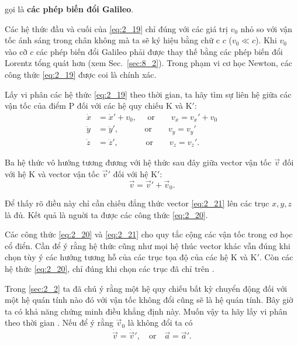 \noindent
gọi là \textbf{các phép biến đổi Galileo}.

Các hệ thức đầu và cuối của \eqref{eq:2_19} chỉ đúng với các giá trị $v_0$ nhỏ so với vận tốc ánh sáng trong chân không mà ta sẽ ký hiệu bằng chữ c $c$ ($v_0\ll c$). Khi $v_0$ vào cỡ $c$ các phép biến đổi Galileo phải được thay thế bằng các phép biến đổi Lorentz tổng quát hơn (xem Sec.~\ref{sec:8_2}). Trong phạm vi cơ học Newton, các công thức \eqref{eq:2_19} được coi là chính xác.

Lấy vi phân các hệ thức \eqref{eq:2_19} theo thời gian, ta hãy tìm sự liên hệ giữa các vận tốc của điểm P đối với các hệ quy chiếu K và K$'$:
\begin{align}
\dot{x} &= \dot{x}'+v_0, \quad\,\,\text{or}\quad\quad v_x=v_x'+v_0\nonumber\\
\dot{y} &= \dot{y}', \quad\quad\,\,\,\,\,\,\,\text{or}\quad\quad v_y=v_y'\label{eq:2_20}\\
\dot{z} &= \dot{z}', \quad\quad\,\,\,\,\,\,\,\,\text{or}\quad\quad v_z=v_z'.\nonumber
\end{align}

Ba hệ thức vô hướng  tương đương với hệ thức sau đây giữa vector vận tốc $\vec{v}$ đối với hệ K và vector vận tốc $\vec{v}'$ đối với hệ K$'$:
\begin{equation}\label{eq:2_21}
\vec{v} = \vec{v}' + \vec{v}_0.
\end{equation}

\noindent
Để thấy rõ điều này chỉ cần chiếu đẳng thức vector \eqref{eq:2_21} lên các trục $x, y, z$ là đủ. Kết quả là nguời ta được các công thức \eqref{eq:2_20}.

Các công thức \eqref{eq:2_20} và \eqref{eq:2_21} cho quy tắc cộng các vận tốc trong cơ học cổ điển. Cần để ý rằng hệ thức  cũng như mọi hệ thúc vector khác vẫn đúng khi chọn tùy ý các hướng tương hỗ của các trục tọa độ của các hệ K và K$'$. Còn các hệ thức \eqref{eq:2_20}, chỉ đúng khi chọn các trục đã chỉ trên .

Trong \ref{sec:2_2} ta đã chú ý rằng một hệ quy chiếu bất kỳ chuyển động đối với một hệ quán tính nào đó với vận tốc không đổi cũng sẽ là hệ quán tính. Bây giờ ta có khả năng chứng minh điều khẳng định này. Muốn vậy ta hãy lấy vi phân theo thời gian . Nếu để ý rằng $\vec{v}_0$ là không đổi ta có
\begin{equation}\label{eq:2_22}
\dot{\vec{v}} = \dot{\vec{v}}', \quad\text{or}\quad  \vec{a} = \vec{a}'.
\end{equation}


